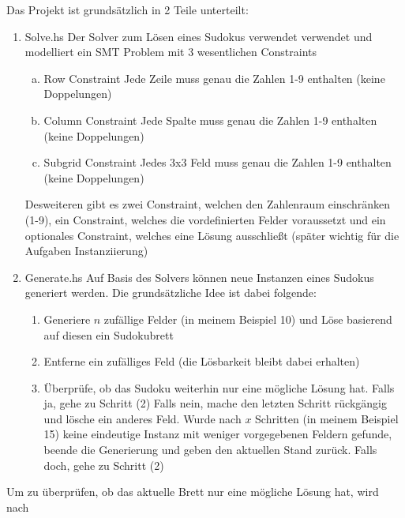 Das Projekt ist grundsätzlich in 2 Teile unterteilt:
\begin{enumerate}[(1)]
    \item Solve.hs \newline
    Der Solver zum Lösen eines Sudokus verwendet verwendet und modelliert ein SMT Problem mit 3 wesentlichen Constraints
        \begin{enumerate}[(a)]
            \item Row Constraint \newline
            Jede Zeile muss genau die Zahlen 1-9 enthalten (keine Doppelungen)
            \item Column Constraint \newline
            Jede Spalte muss genau die Zahlen 1-9 enthalten (keine Doppelungen)
            \item Subgrid Constraint \newline
            Jedes 3x3 Feld muss genau die Zahlen 1-9 enthalten (keine Doppelungen)
        \end{enumerate}
    Desweiteren gibt es zwei Constraint, welchen den Zahlenraum einschränken (1-9), ein Constraint, welches die vordefinierten Felder voraussetzt und ein optionales Constraint, welches eine Lösung ausschließt (später wichtig für die Aufgaben Instanziierung)
    \item Generate.hs \newline
    Auf Basis des Solvers können neue Instanzen eines Sudokus generiert werden. Die grundsätzliche Idee ist dabei folgende:
        \begin{enumerate}[(1)]
            \item Generiere \(n\) zufällige Felder (in meinem Beispiel 10) und Löse basierend auf diesen ein Sudokubrett
            \item Entferne ein zufälliges Feld (die Lösbarkeit bleibt dabei erhalten)
            \item Überprüfe, ob das Sudoku weiterhin nur eine mögliche Lösung hat. \newline
            Falls ja, gehe zu Schritt (2) \newline
            Falls nein, mache den letzten Schritt rückgängig und lösche ein anderes Feld. Wurde nach \(x\) Schritten (in meinem Beispiel 15) keine eindeutige Instanz mit weniger vorgegebenen Feldern gefunde, beende die Generierung und geben den aktuellen Stand zurück. Falls doch, gehe zu Schritt (2)
        \end{enumerate}
\end{enumerate}
Um zu überprüfen, ob das aktuelle Brett nur eine mögliche Lösung hat, wird nach



